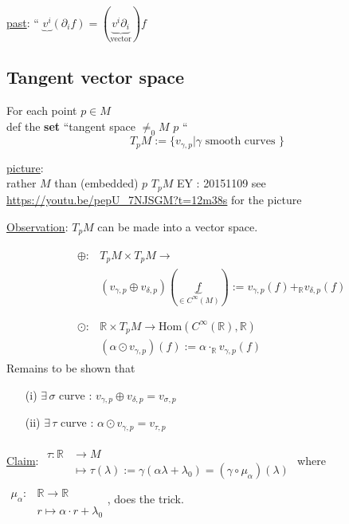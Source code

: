\underline{past}: `` $\underbrace{v^i}_{} (\partial_i f) = (\underbrace{v^i \partial_i}_{\text{vector}})f$ 

\subsection{Tangent vector space}

\begin{definition}
  For each point $p \in M$ \\
def the \textbf{set} ``tangent space $\neq_0 M$ \@ $p$ ``
\[
T_p M := \lbrace v_{\gamma, p} | \gamma \text{ smooth curves } \rbrace
\]
\end{definition}

\underline{picture}:\\
rather $M$ than (embedded) $p$ $T_pM$ EY : 20151109 see \url{https://youtu.be/pepU_7NJSGM?t=12m38s} for the picture

\underline{Observation}: $T_pM$ can be made into a vector space. 

\[
\begin{aligned}
& \begin{aligned}
  \oplus : & T_pM \times T_pM \to   \\
  & (v_{\gamma,p} \oplus v_{\delta,p})(\underbrace{f}_{ \in C^{\infty}(M)} ) := v_{\gamma,p}(f) +_{\mathbb{R}} v_{\delta,p}(f) \\
  \end{aligned} \\
& \begin{aligned}
    \odot : & \mathbb{R} \times T_pM \to \text{Hom}(C^{\infty}(\mathbb{R}),\mathbb{R}) \\
    & (\alpha \odot v_{\gamma,p} )(f) := \alpha \cdot_{\mathbb{R}}  v_{\gamma, p}(f)
\end{aligned}
\end{aligned}
\]
Remains to be shown that 
\begin{enumerate}
  \item[(i)] $\exists \, \sigma$ curve : $v_{\gamma,p} \oplus v_{\delta,p} = v_{\sigma,p}$
  \item[(ii)] $\exists \, \tau $ curve : $\alpha \odot v_{\gamma,p} = v_{\tau,p}$
\end{enumerate}

\underline{Claim}: $\begin{aligned} & \quad \\ 
  \tau : \mathbb{R}&  \to M  \\
  & \mapsto \tau(\lambda) := \gamma(\alpha  \lambda + \lambda_0) = (\gamma \circ \mu_{\alpha})(\lambda)
\end{aligned}$
where $\begin{aligned} & \quad \\
   \mu_{\alpha}: & \mathbb{R} \to \mathbb{R} \\ 
   & r \mapsto \alpha \cdot r + \lambda_0 \end{aligned}$, 
does the trick.

